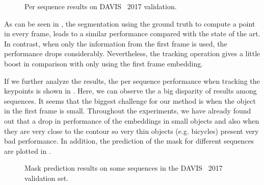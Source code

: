 \begin{figure}[H]
  \centering
  
  \caption{Per sequence results on DAVIS~\davislast{} 2017 validation. }
  \label{fig:experiments:videosegmentation:persequencemiou}
\end{figure}

As can be seen in , the segmentation using the ground truth to compute a point in every frame, leads to a similar performance compared with the state of the art.
In contrast, when only the information from the first frame is used, the performance drops considerably.
Nevertheless, the tracking operation gives a little boost in comparison with only using the first frame embedding.

If we further analyze the results, the per sequence performance when tracking the keypoints is shown in .
Here, we can observe the a big disparity of results among sequences.
It seems that the biggest challenge for our method is when the object in the first frame is small.
Throughout the experiments, we have already found out that a drop in performance of the embeddings in small objects and also when they are very close to the contour so very thin objects (e.g. bicycles) present very bad performance.
In addition, the prediction of the mask for different sequences are plotted in .

\begin{figure}[ht]
  \centering
  \caption{Mask prediction results on some sequences in the DAVIS~\davislast{} 2017 validation set. }
  \label{fig:experiments:videosegmentation:predmasksdavis}
\end{figure}
